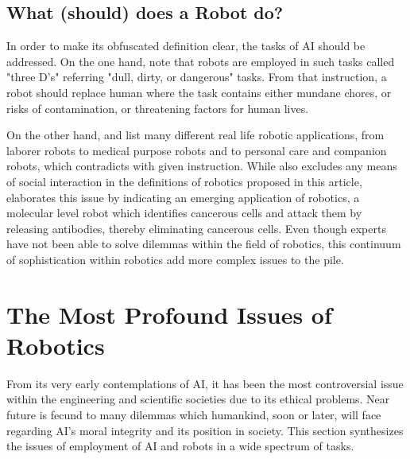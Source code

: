 \documentclass[man]{apa6}
\begin{document}
\subsection{What (should) does a Robot do?}
In order to make its obfuscated definition clear, the tasks of AI should be addressed.
On the one hand,   note that robots are employed in such tasks called "three D's" referring "dull, dirty, or dangerous" tasks.
From that instruction, a robot should replace human where the task contains either mundane chores, or risks of contamination, or threatening factors for human lives.
\par 
\par
On the other hand,  and  list many different real life robotic applications, from laborer robots to medical purpose robots and to personal care and companion robots, which contradicts with given instruction.
While  also excludes any means of social interaction in the definitions of robotics proposed in this article,  elaborates this issue by indicating an emerging application of robotics, a molecular level robot which identifies cancerous cells and attack them by releasing antibodies, thereby eliminating cancerous cells.
Even though experts have not been able to solve dilemmas within the field of robotics, this continuum of sophistication within robotics add more complex issues to the pile.
\par
\section{The Most Profound Issues of Robotics}
From its very early contemplations of AI, it has been the most controversial issue within the engineering and scientific societies due to its ethical problems.
Near future is fecund to many dilemmas which humankind, soon or later, will face regarding AI's moral integrity and its position in society.
This section synthesizes the issues of employment of AI and robots in a wide spectrum of tasks.
\end{document}
